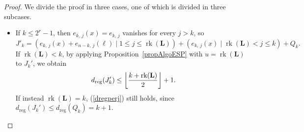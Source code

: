 \documentclass[11pt]{article}
\newcommand{\es}[2]{e_{#1,\, #2}}
\DeclarePairedDelimiter{\fl}{\lfloor}{\rfloor}
\theoremstyle{plain}
\theoremstyle{definition}
\theoremstyle{remark}
\begin{document}
\begin{proof}
We divide the proof in three cases, one of which is divided in three subcases.
\begin{itemize}
\item If $k\leq 2^r-1$, then $\es{k}{j}(x)=\es{k}{j}$ vanishes for every $j> k$, so $J'_k=(\es{k}{j}(x)+\es{n-k}{j}(\ell)\mid 1\leq j\leq\operatorname{rk}(\mathbf{L}))+(\es{k}{j}(x)\mid \operatorname{rk}(\mathbf{L})<j\leq k)+Q_k.$
If $\operatorname{rk}(\mathbf{L})<k$, by applying Proposition~\ref{propAlgoESP} with $u=\operatorname{rk}(\mathbf{L})$ to $J_k'$, we obtain
\begin{equation}\label{dregperj}
    d_{\operatorname{reg}}(J_k')\leq \fl*{\frac{k+\operatorname{rk}(\mathbf{L})}{2}}+1.
\end{equation}
If instead $\operatorname{rk}(\mathbf{L})=k$, (\ref{dregperj}) still holds, since $d_{\operatorname{reg}}(J_k')\leq d_{\operatorname{reg}}(Q_k)=k+1$.


\end{itemize}
\end{proof}
\end{document}
